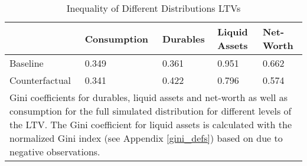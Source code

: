 \documentclass[a4paper,12pt,legno]{article}
\begin{document}
\begin{table}[!htbp]
\centering
\caption{Inequality of Different Distributions LTVs}
\label{Gini_Ranking_counter_factual}
\begin{tabular}{@{}lllll@{}}
\toprule
      & Consumption & Durables & Liquid Assets & Net-Worth \\ \midrule
Baseline & 0.349       & 0.361   & 0.951        & 0.662    \\ \midrule
Counterfactual  & 0.341         & 0.422     & 0.796          & 0.574      \\ \bottomrule
\multicolumn{5}{l}{%
  \begin{minipage}{12.5cm}%
    \small Gini coefficients for durables, liquid assets and net-worth as well as consumption for the full simulated distribution for different levels of the LTV. The Gini coefficient for liquid assets is calculated with the normalized Gini index (see Appendix \ref{gini_defs}) based on \cite{chen1982} due to negative observations. 
  \end{minipage}%
}\\
\end{tabular}
\end{table}
\end{document}
